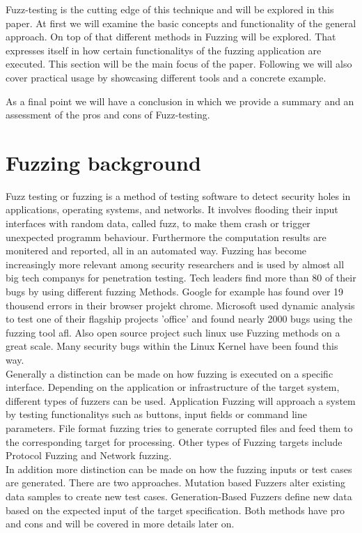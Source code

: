 \documentclass[journal=tosc,final]{iacrtrans}
\begin{document}
Fuzz-testing is the cutting edge of this technique and will be explored in this paper. At first we will examine the basic concepts and functionality of the general approach. On top of that different methods in Fuzzing will be explored. That expresses itself in how certain functionalitys of the fuzzing application are executed. This section will be the main focus of the paper. Following we will also cover practical usage by showcasing different tools and a concrete example. 

As a final point we will have a conclusion in which we provide a summary and an assessment of the pros and cons of Fuzz-testing. 
\newpage
\section{Fuzzing background}
Fuzz testing or fuzzing is a method of testing software to detect security holes in applications, operating systems, and networks. It involves flooding their input interfaces with random data, called fuzz, to make them crash or trigger unexpected programm behaviour. Furthermore the computation results are monitered and reported, all in an automated way. Fuzzing has become increasingly more relevant among security researchers and is used by almost all big tech companys for penetration testing. Tech leaders find more than 80 of their bugs by using different fuzzing Methods. Google for example  has found over 19 thousend errors in their browser projekt chrome. Microsoft used dynamic analysis to test one of their flagship projects 'office' and found nearly 2000 bugs using the fuzzing tool afl. Also open source project such linux use Fuzzing methods on a great scale. Many security bugs within the Linux Kernel have been found this way.\\
Generally a distinction can be made on how fuzzing is executed on a specific interface. Depending on the application or infrastructure of the target system, different types of fuzzers can be used. Application Fuzzing will approach a system by testing functionalitys such as buttons, input fields or command line parameters. File format fuzzing tries to generate corrupted files and feed them to the corresponding target for processing. Other types of Fuzzing targets include Protocol Fuzzing and Network fuzzing.\\
In addition more distinction can be made on how the fuzzing inputs or test cases are generated. There are two approaches. Mutation based Fuzzers alter existing data samples to create new test cases. Generation-Based Fuzzers define new data based on the expected input of the target specification. Both methods have pro and cons and will be covered in more details later on.
\end{document}
